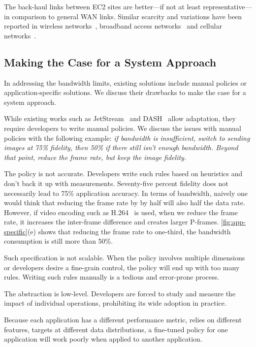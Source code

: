 The back-haul links between EC2 sites are better---if not at least
representative---in comparison to general WAN links. Similar scarcity and
variations have been reported in wireless networks~\cite{biswas2015large},
broadband access networks~\cite{grover2013peeking, sundaresan2014bismark} and
cellular networks~\cite{nikravesh2014mobile}.

\subsection{Making the Case for a System Approach}
\label{sec:making-case-sys-approach}

In addressing the bandwidth limits, existing solutions include manual policies
or application-specific solutions. We discuss their drawbacks to make the case
for a system approach.

 While existing works such as
JetStream~\cite{rabkin2014aggregation} and DASH~\cite{sodagar2011mpeg} allow
adaptation, they require developers to write manual policies. We discuss the
issues with manual policies with the following example: \textit{if bandwidth is
  insufficient, switch to sending images at 75\% fidelity, then 50\% if there
  still isn't enough bandwidth. Beyond that point, reduce the frame rate, but
  keep the image fidelity.}

The policy is not accurate. Developers write such rules based on heuristics and
don't back it up with measurements. Seventy-five percent fidelity does not
necessarily lead to 75\% application accuracy. In terms of bandwidth, naively
one would think that reducing the frame rate by by half will also half the data
rate. However, if video encoding such as H.264~\cite{richardson2011h} is used,
when we reduce the frame rate, it increases the inter-frame difference and
creates larger P-frames. \autoref{fig:app-specific}(e) shows that reducing the
frame rate to one-third, the bandwidth consumption is still more than 50\%.

Such specification is not scalable. When the policy involves multiple dimensions
or developers desire a fine-grain control, the policy will end up with too many
rules.  Writing such rules manually is a tedious and error-prone process.

The abstraction is low-level. Developers are forced to study and measure the
impact of individual operations, prohibiting its wide adoption in practice.

 Because each application
has a different performance metric, relies on different features, targets at
different data distributions, a fine-tuned policy for one application will work
poorly when applied to another application.


